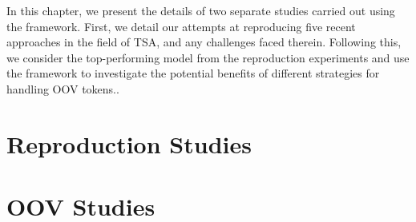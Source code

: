 \documentclass[../../fyp.tex]{subfiles}
\begin{document}
In this chapter, we present the details of two separate studies carried out using the framework. First, we detail our attempts at reproducing five recent approaches in the field of TSA, and any challenges faced therein. Following this, we consider the top-performing model from the reproduction experiments and use the framework to investigate the potential benefits of different strategies for handling OOV tokens..

\section{Reproduction Studies}


\section{OOV Studies}

\end{document}
